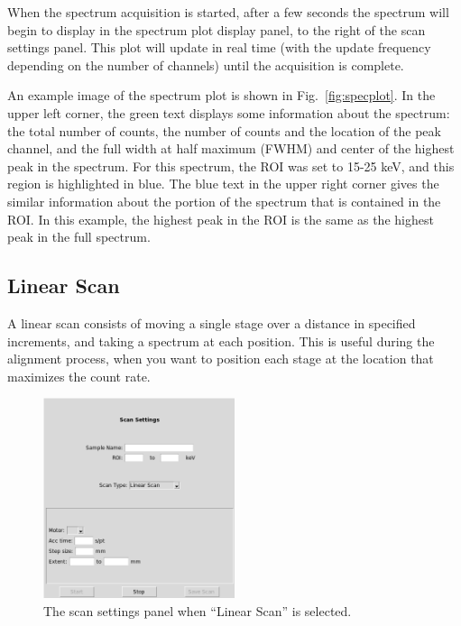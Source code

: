 When the spectrum acquisition is started, after a few seconds the spectrum will begin to display in the spectrum plot display panel, to the right of the scan settings panel. This plot will update in real time (with the update frequency depending on the number of channels) until the acquisition is complete.

An example image of the spectrum plot is shown in Fig.~\ref{fig:specplot}. In the upper left corner, the green text displays some information about the spectrum: the total number of counts, the number of counts and the location of the peak channel, and the full width at half maximum (FWHM) and center of the highest peak in the spectrum.
For this spectrum, the ROI was set to 15-25 keV, and this region is highlighted in blue. The blue text in the upper right corner gives the similar information about the portion of the spectrum that is contained in the ROI. In this example, the highest peak in the ROI is the same as the highest peak in the full spectrum.

\subsection{Linear Scan}

A linear scan consists of moving a single stage over a distance in specified increments, and taking a spectrum at each position. This is useful during the alignment process, when you want to position each stage at the location that maximizes the count rate.

\begin{figure}
\centering
\includegraphics[width=0.5\textwidth]{linscan.png}
\caption{\label{fig:linscan} The scan settings panel when ``Linear Scan'' is selected.}
\end{figure}

